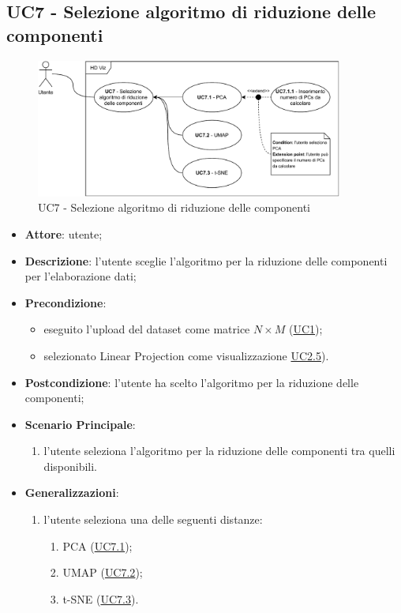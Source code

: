 \subsection{UC7 - Selezione algoritmo di riduzione delle componenti}
    \label{uc7}
    
    \begin{figure}[htbp]
        \centering
        \includegraphics[width=0.9\textwidth]{source/sections/casi-uso/diagrams/uc7.pdf}
        \caption{UC7 - Selezione algoritmo di riduzione delle componenti}
        \label{fig:uc7}
    \end{figure}
    
    \begin{itemize}
    \item \textbf{Attore}: utente;
    \item \textbf{Descrizione}: l'utente sceglie l'algoritmo per la riduzione delle componenti per l'elaborazione dati;
    \item \textbf{Precondizione}: 
    \begin{itemize}
        \item eseguito l'upload del dataset come matrice $N\times M$ (\hyperref[uc1]{UC1});
        \item selezionato Linear Projection come visualizzazione \hyperref[uc2.5]{UC2.5}).
    \end{itemize}  
    \item \textbf{Postcondizione}: l'utente ha scelto l'algoritmo per la riduzione delle componenti;
    \item \textbf{Scenario Principale}: 
    \begin{enumerate}
        \item l'utente seleziona l'algoritmo per la riduzione delle componenti tra quelli disponibili.
    \end{enumerate}
    \item \textbf{Generalizzazioni}:
        \begin{enumerate}
            \item l'utente seleziona una delle seguenti distanze:
                \begin{enumerate}
                    \item PCA (\hyperref[uc7.1]{UC7.1});
                    \item UMAP (\hyperref[uc7.2]{UC7.2});
                    \item t-SNE (\hyperref[uc7.3]{UC7.3}).
                \end{enumerate}
        \end{enumerate}  
    \end{itemize}
    
